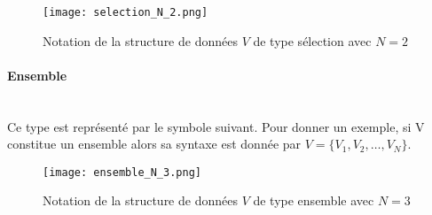 \begin{figure}[H]
    \centering
    \texttt{[image: selection\_N\_2.png]}
    \caption{Notation de la structure de données $V$ de type sélection avec $N=2$}
    \label{fig:selection_N_2}
\end{figure}

\paragraph{Ensemble} ~~\\ \noindent
Ce type est représenté par le symbole suivant. Pour donner un exemple, si V constitue un ensemble alors sa syntaxe est donnée par $V=\{V_1,V_2,\ldots,V_N\}$.

\begin{figure}[H]
    \centering
    \texttt{[image: ensemble\_N\_3.png]}
    \caption{Notation de la structure de données $V$ de type ensemble avec $N=3$}
    \label{fig:ensemble_N_3}
\end{figure}
